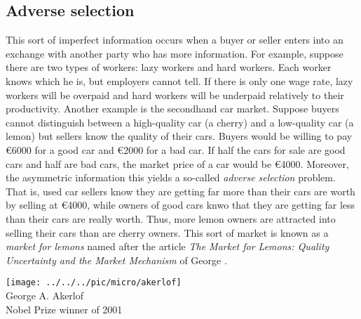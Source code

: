 \subsection{Adverse selection}
\begin{minipage}{0.7\textwidth}
	This sort of imperfect information occurs when a buyer or seller enters into an exchange with another party who has more information. For example, suppose there are two types of workers: lazy workers and hard workers. Each worker knows which he is, but employers cannot tell. If there is only one wage rate, lazy workers will be overpaid and hard workers will be underpaid relatively to their productivity. Another example is the secondhand car market. Suppose buyers cannot distinguish between a high-quality car (a cherry) and a low-quality car (a lemon) but sellers know the quality of their cars. Buyers would be willing to pay \euro 6000 for a good car and \euro 2000 for a bad car. If half the cars for sale are good cars and half are bad cars, the market price of a car would be \euro 4000.
	Moreover, the asymmetric information this yields a so-called \textit{adverse selection} problem. That is, used car sellers know they are getting far more than their cars are worth by selling at \euro 4000, while owners of good cars knwo that they are getting far less than their cars are really worth. Thus, more lemon owners are attracted into selling their cars than are cherry owners. This sort of market is known as a \textit{market for lemons} named after the article \textit{The Market for Lemons: Quality Uncertainty and the Market Mechanism} of George \citet[][]{George1970market}.
\end{minipage}
\begin{minipage}{0.3\textwidth}
	\begin{center}
		\texttt{[image: ../../../pic/micro/akerlof]}\\
		George A. Akerlof\\	Nobel Prize winner of 2001
	\end{center}
\end{minipage}



\pbn
{}


